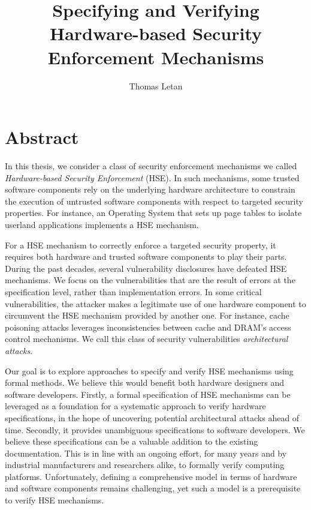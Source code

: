 \documentclass{article}
\title{Specifying and Verifying Hardware-based Security Enforcement Mechanisms}
\author{Thomas Letan}
\date{}
\begin{document}
\maketitle

\section{Abstract}

In this thesis, we consider a class of security enforcement mechanisms we called
\emph{Hardware-based Security Enforcement} (HSE).
%
In such mechanisms, some trusted software components rely on the underlying
hardware architecture to constrain the execution of untrusted software
components with respect to targeted security properties.
%
For instance, an Operating System that sets up page tables to isolate userland
applications implements a HSE mechanism.

For a HSE mechanism to correctly enforce a targeted security property, it
requires both hardware and trusted software components to play their parts.
%
During the past decades, several vulnerability disclosures have defeated HSE
mechanisms.
%
We focus on the vulnerabilities that are the result of errors at the
specification level, rather than implementation errors.
%
In some critical vulnerabilities, the attacker makes a legitimate use of one
hardware component to circumvent the HSE mechanism provided by another one.
%
For instance, cache poisoning attacks leverages inconsistencies between cache
and DRAM's access control mechanisms.
%
We call this class of security vulnerabilities \emph{architectural attacks}.

Our goal is to explore approaches to specify and verify HSE mechanisms using
formal methods.
%
We believe this would benefit both hardware designers and software developers.
%
Firstly, a formal specification of HSE mechanisms can be leveraged as a
foundation for a systematic approach to verify hardware specifications, in the
hope of uncovering potential architectural attacks ahead of time.
%
Secondly, it provides unambiguous specifications to software developers. We
believe these specifications can be a valuable addition to the existing
documentation.
%
This is in line with an ongoing effort, for many years and by industrial
manufacturers and researchers alike, to formally verify computing platforms.
%
Unfortunately, defining a comprehensive model in terms of hardware and software
components remains challenging, yet such a model is a prerequisite to verify HSE
mechanisms.
\end{document}
